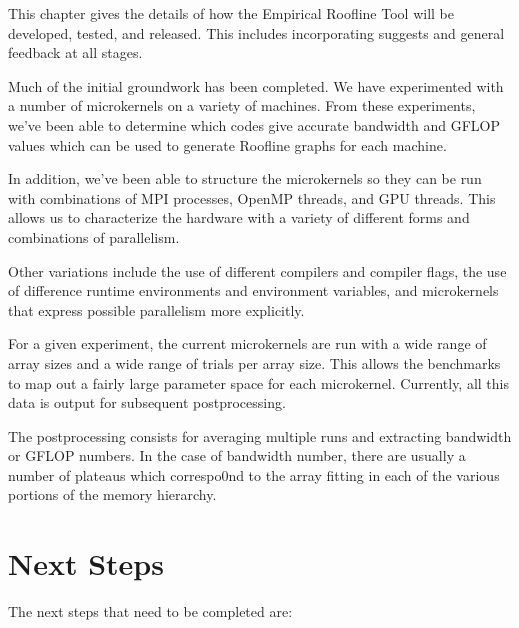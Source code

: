 This chapter gives the details of how the Empirical Roofline Tool will be
developed, tested, and released. This includes incorporating suggests and
general feedback at all stages.

Much of the initial groundwork has been completed.  We have experimented with
a number of microkernels on a variety of machines.  From these experiments,
we’ve been able to determine which codes give accurate bandwidth and GFLOP
values which can be used to generate Roofline graphs for each machine.

In addition, we’ve been able to structure the microkernels so they can be run
with combinations of MPI processes, OpenMP threads, and GPU threads.  This
allows us to characterize the hardware with a variety of different forms and
combinations of parallelism.

Other variations include the use of different compilers and compiler flags,
the use of difference runtime environments and environment variables, and
microkernels that express possible parallelism more explicitly.

For a given experiment, the current microkernels are run with a wide range of
array sizes and a wide range of trials per array size.  This allows the
benchmarks to map out a fairly large parameter space for each microkernel.
Currently, all this data is output for subsequent postprocessing.

The postprocessing consists for averaging multiple runs and extracting
bandwidth or GFLOP numbers.  In the case of bandwidth number, there are
usually a number of plateaus which correspo0nd to the array fitting in each of
the various portions of the memory hierarchy.

\section{Next Steps}
The next steps that need to be completed are:

